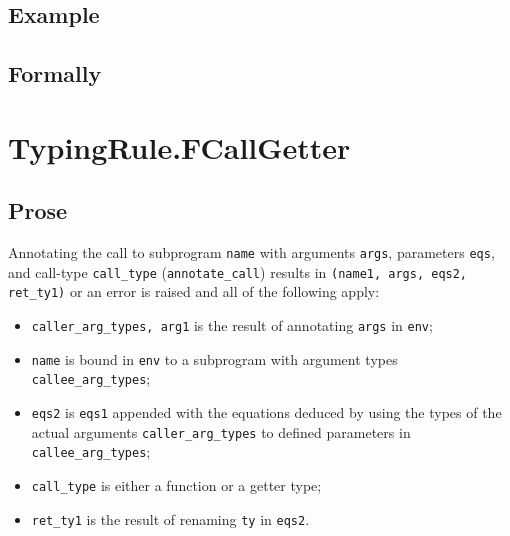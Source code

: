\documentclass{book}
\begin{document}
\begin{itemize}
  \subsection{Example}



\begin{emptyformal}
    \subsection{Formally}
\end{emptyformal}


\section{TypingRule.FCallGetter \label{sec:TypingRule.FCallGetter}}

  \subsection{Prose}
  Annotating the call to subprogram \texttt{name} with arguments \texttt{args},
  parameters \texttt{eqs}, and call-type \texttt{call\_type}
  (\texttt{annotate\_call}) results in \texttt{(name1, args, eqs2, ret\_ty1)}
  or an error is raised and all of the following apply:
   \begin{itemize}
   \item \texttt{caller\_arg\_types, arg1} is the result of annotating \texttt{args} in \texttt{env};
   \item \texttt{name} is bound in \texttt{env} to a subprogram with argument types
      \\ \texttt{callee\_arg\_types};
   \item \texttt{eqs2} is \texttt{eqs1} appended with the equations deduced by
     using the types of the actual arguments \texttt{caller\_arg\_types} to
     defined parameters in \\ \texttt{callee\_arg\_types};
   \item \texttt{call\_type} is either a function or a getter type;
   \item \texttt{ret\_ty1} is the result of renaming \texttt{ty} in \texttt{eqs2}.
   \end{itemize}


\end{itemize}
\end{document}
